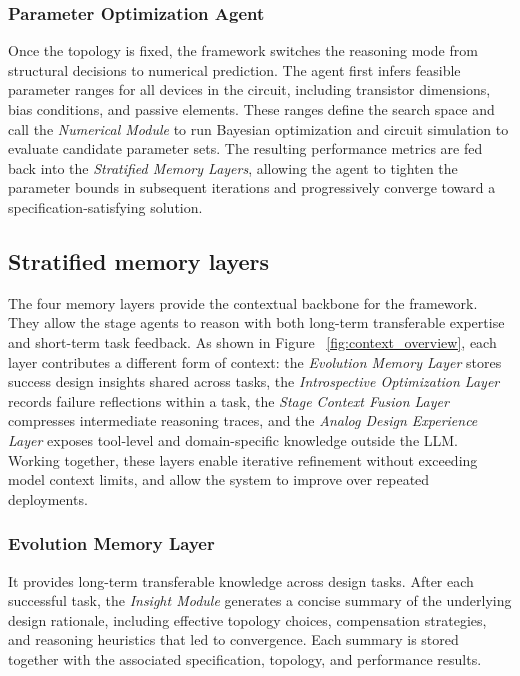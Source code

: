 \documentclass[sigconf,nonacm]{acmart}
\begin{document}
\subsubsection{Parameter Optimization Agent}



Once the topology is fixed, the framework switches the reasoning mode from structural decisions to numerical prediction. The agent first infers feasible parameter ranges for all devices in the circuit, including transistor dimensions, bias conditions, and passive elements. These ranges define the search space and call the \emph{Numerical Module } to run Bayesian optimization and circuit simulation to evaluate candidate parameter sets. The resulting performance metrics are fed back into the \emph{Stratified Memory Layers}, allowing the agent to tighten the parameter bounds in subsequent iterations and progressively converge toward a specification-satisfying solution.


\subsection{Stratified memory layers}

The four memory layers provide the contextual backbone for the framework. They allow the stage agents to reason with both long-term transferable expertise and short-term task feedback. As shown in Figure ~\ref{fig:context_overview}, each layer contributes a different form of context: the \emph{Evolution Memory Layer} stores success design insights shared across tasks, the \emph{Introspective Optimization Layer} records failure reflections within a task, the \emph{Stage Context Fusion Layer} compresses intermediate reasoning traces, and the \emph{Analog Design Experience Layer} exposes tool-level and domain-specific knowledge outside the LLM. Working together, these layers enable iterative refinement without exceeding model context limits, and allow the system to improve over repeated deployments.

\subsubsection{Evolution Memory Layer}

It provides long-term transferable knowledge across design tasks. After each successful task, the \emph{Insight Module} generates a concise summary of the underlying design rationale, including effective topology choices, compensation strategies, and reasoning heuristics that led to convergence. Each summary is stored together with the associated specification, topology, and performance results.
\end{document}
